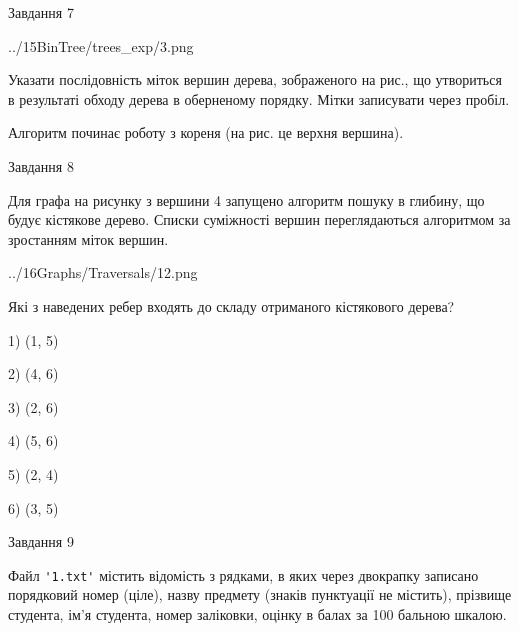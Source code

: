\documentclass[12pt, ukrainian]{article}
\def\code#1{\Verb!#1!}
\begin{document}
{\vspace{10mm}\par

\newpage
\begin{minipage}[t]{9.7cm}
               
{\begin{center}Завдання {7}\end{center}}
\vspace{-4mm}

\begin{center}
	{../15BinTree/trees_exp/3.png}
\end{center}
Указати послідовність міток вершин дерева, зображеного на рис., що утвориться в результаті обходу дерева в оберненому порядку. Мітки записувати через пробіл.\par Алгоритм починає роботу з кореня (на рис. це верхня вершина).\par

\end{minipage}
\vline \hspace{8mm}
\begin{minipage}[t]{8.0cm}
               
{\begin{center}Завдання {8}\end{center}}
\vspace{-4mm}
Для графа на рисунку з вершини 4 запущено алгоритм пошуку в глибину, що будує кістякове дерево. Списки суміжності вершин переглядаються алгоритмом за зростанням міток вершин.\par
\begin{center}
	{../16Graphs/Traversals/12.png}
\end{center}
\par Які з наведених ребер входять до складу отриманого кістякового дерева?\par
1) (1, 5)\par
2) (4, 6)\par
3) (2, 6)\par
4) (5, 6)\par
5) (2, 4)\par
6) (3, 5)\par
{\vskip 15pt} \par

\end{minipage}

               
{\begin{center}Завдання {9}\end{center}}
\vspace{-4mm}
Файл \code{'1.txt'} містить відомість з рядками, в яких через двокрапку записано поряд\-ковий номер (ціле), назву предмету (знаків пунктуації не містить), прізвище студента, ім'я студента, номер заліковки, оцінку в балах за 100 бальною шкалою.

}
\end{document}
